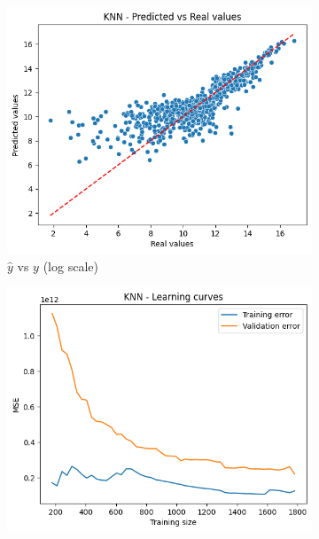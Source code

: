 \begin{figure}
    \centering
        \begin{subfigure}[b]{0.3\textwidth}
            \centering
            \includegraphics[width=\textwidth]{assets/images/knn-ypred-vs-ytest.png}
            \caption{$\hat{y}$ vs $y$ (log scale)}
            \label{knn:ypred-vs-yreal}
        \end{subfigure}
    \hfill
        \begin{subfigure}[b]{0.3\textwidth}
            \centering
            \includegraphics[width=\textwidth]{assets/images/knn-learning-curve.png}

\end{subfigure}
\end{figure}

